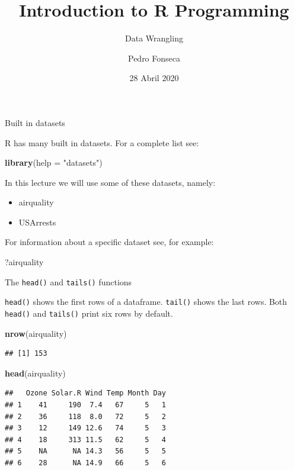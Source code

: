 \documentclass[ignorenonframetext,]{beamer}
\title{Introduction to R Programming}
\subtitle{Data Wrangling}
\author{Pedro Fonseca}
\date{28 Abril 2020}
\newenvironment{Shaded}{\begin{snugshade}}{\end{snugshade}}
\newcommand{\DataTypeTok}[1]{\textcolor[rgb]{0.13,0.29,0.53}{#1}}
\newcommand{\KeywordTok}[1]{\textcolor[rgb]{0.13,0.29,0.53}{\textbf{#1}}}
\newcommand{\NormalTok}[1]{#1}
\newcommand{\StringTok}[1]{\textcolor[rgb]{0.31,0.60,0.02}{#1}}
\providecommand{\tightlist}{%
  \setlength{\itemsep}{0pt}\setlength{\parskip}{0pt}}
\begin{document}
\frame{\titlepage}

\begin{frame}[fragile]{Built in datasets}
\protect\hypertarget{built-in-datasets}{}

R has many built in datasets. For a complete list see:

\begin{Shaded}
\begin{Highlighting}[]
\KeywordTok{library}\NormalTok{(}\DataTypeTok{help =} \StringTok{"datasets"}\NormalTok{)}
\end{Highlighting}
\end{Shaded}

In this lecture we will use some of these datasets, namely:

\begin{itemize}
\tightlist
\item
  airquality
\item
  USArrests
\end{itemize}

For information about a specific dataset see, for example:

\begin{Shaded}
\begin{Highlighting}[]
\NormalTok{?airquality}
\end{Highlighting}
\end{Shaded}

\end{frame}

\begin{frame}[fragile]{The \texttt{head()} and \texttt{tails()}
functions}
\protect\hypertarget{the-head-and-tails-functions}{}

\texttt{head()} shows the first rows of a dataframe. \texttt{tail()}
shows the last rows. Both \texttt{head()} and \texttt{tails()} print six
rows by default.

\begin{Shaded}
\begin{Highlighting}[]
\KeywordTok{nrow}\NormalTok{(airquality)}
\end{Highlighting}
\end{Shaded}

\begin{verbatim}
## [1] 153
\end{verbatim}

\begin{Shaded}
\begin{Highlighting}[]
\KeywordTok{head}\NormalTok{(airquality)}
\end{Highlighting}
\end{Shaded}

\begin{verbatim}
##   Ozone Solar.R Wind Temp Month Day
## 1    41     190  7.4   67     5   1
## 2    36     118  8.0   72     5   2
## 3    12     149 12.6   74     5   3
## 4    18     313 11.5   62     5   4
## 5    NA      NA 14.3   56     5   5
## 6    28      NA 14.9   66     5   6
\end{verbatim}

\end{frame}
\end{document}
